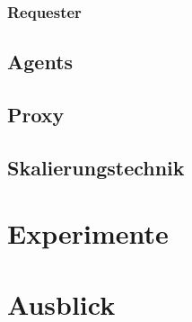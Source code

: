 \documentclass[runningheads]{llncs}
\begin{document}
\subsubsection{Requester}
	
\subsection{Agents}
	
\subsection{Proxy}

\subsection{Skalierungstechnik}

\section{Experimente}
	
	
\section{Ausblick}
	
%
%
\newpage


%
\end{document}
